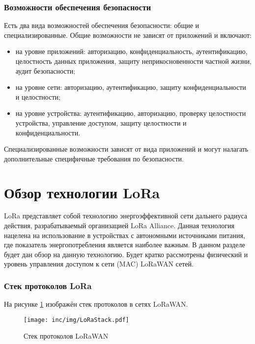 \subsubsection{Возможности обеспечения безопасности}

Есть два вида возможностей обеспечения безопасности: общие и специализированные.
Общие возможности не зависят от приложений и включают:
\begin{itemize}
	\item на уровне приложений: авторизацию, конфиденциальность, аутентификацию, целостность данных приложения, защиту неприкосновенности частной жизни, аудит безопасности;
	\item на уровне сети: авторизацию, аутентификацию, защиту конфиденциальности и целостности;
	\item на уровне устройства: аутентификацию, авторизацию, проверку целостности устройства, управление доступом, защиту целостности и конфиденциальности.
\end{itemize}

Специализированные возможности зависят от вида приложений и могут налагать дополнительные специфичные требования по безопасности.

\newpage
\section{Обзор технологии LoRa} 

LoRa представляет собой технологию энергоэффективной сети дальнего радиуса действия, разрабатываемый организацией LoRa Alliance.
Данная технология нацелена на использование в устройствах с автономными источниками питания, где показатель энергопотребления является наиболее важным.
В данном разделе будет дан обзор на данную технологию.
Будет кратко рассмотрены физический и уровень управления доступом к сети (MAC) LoRaWAN сетей.

\subsubsection{Стек протоколов LoRa}

На рисунке \ref{fig:lorastack} изображён стек протоколов в сетях LoRaWAN. 

\begin{figure}[!h]
  \centering
  \texttt{[image: inc/img/LoRaStack.pdf]}
	\caption{Стек протоколов LoRaWAN}
  \label{fig:lorastack}
\end{figure}

